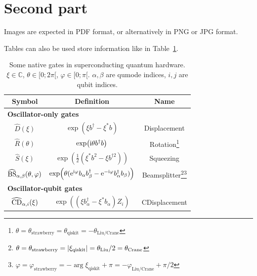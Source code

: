 \documentclass[
 reprint,
 unsortedaddress,
 preprintnumbers,
 nobibnotes,
 nofootinbib,
 longbibliography,
 amsmath,amssymb,
 aps,pra,
 onecolumn
]{revtex4-2}
\begin{document}
\section{Second part}

Images are expected in PDF format, or alternatively in PNG or JPG format.


Tables can also be used store information like in Table~\ref{tab:gates}.

\begin{table}[ht]
\begin{ruledtabular}
    \centering
    \begin{tabular}{ccc}
        Symbol & Definition & Name \\ \hline
        \multicolumn{3}{l}{\bf Oscillator-only gates} \\ \hline
        $\hat{D} (\xi)$ & $\exp( \xi  b^\dag - \xi^\ast b )$ & Displacement \\
        $\hat{R} (\theta)$ & $\exp( {\rm i} \theta  b^\dag b )$ & Rotation\footnote{$\theta = \theta_\text{strawberry} = \theta_\text{qiskit} = -\theta_\text{Liu/Crane}$} \\
        $\hat{S} (\xi)$ & $\exp( \frac{1}{2} (\xi^\ast  b^2 - \xi b^{\dag2}) )$ & Squeezing \\
        $\widehat{\rm BS}_{\alpha,\beta} (\theta,\varphi)$ & $\exp( \theta ( {\rm e}^{{\rm i}\varphi} b_\alpha b_\beta^\dag - {\rm e}^{-{\rm i}\varphi} b_\alpha^\dag b_\beta) )$ & Beamsplitter\footnote{$\theta = \theta_\text{strawberry} = \abs{\xi_\text{qiskit}} = \theta_\text{Liu}/2 = \theta_\text{Crane}$}\footnote{$\varphi = \varphi_\text{strawberry} = - \arg{\xi_\text{qiskit}} + \pi = - \varphi_\text{Liu/Crane} + \pi/2$} \\ \hline
        \multicolumn{3}{l}{{\bf Oscillator-qubit gates}} \\ \hline
        $\widehat{\rm CD}_{\alpha,i} (\xi)$ & $\exp( (\xi  b_\alpha^\dag - \xi^\ast b_\alpha) Z_i )$ & CDisplacement
    \end{tabular}
    \caption{Some native gates in superconducting quantum hardware. $\xi\in\mathbb{C}$, $\theta\in [0;2\pi[$, $\varphi\in[0;\pi[$. $\alpha,\beta$ are qumode indices, $i,j$ are qubit indices.}
    \label{tab:gates}
\end{ruledtabular}
\end{table}
\end{document}
